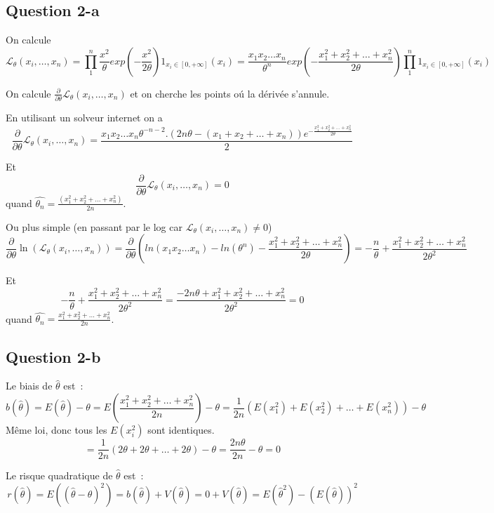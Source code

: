 \documentclass[]{book}
\theoremstyle{definition}
\begin{document}
\subsection*{Question 2-a}
On calcule
$$
\mathcal{L}_{\theta}(x_i,\ldots,x_n) = 
\prod_{1}^{n}\frac{x^2}{\theta} exp \left( -\frac{x^2}{2\theta}\right) 1_{x_i \in [0,+\infty]}(x_i) =
\frac{x_1x_2 \ldots x_n}{\theta^n} exp \left( -\frac{x_1^2+x_2^2+ \ldots +x_n^2 }{2\theta} \right) \prod_{1}^{n}{1_{x_i \in [0,+\infty]}(x_i)}
$$

On calcule $\frac{\partial}{\partial \theta} \mathcal{L}_{\theta}(x_i,\ldots,x_n)$ et on cherche  les points o\'u la d\'eriv\'ee s'annule. 

En utilisant un solveur internet on a 
$$
\frac{\partial}{\partial \theta} \mathcal{L}_{\theta}(x_i,\ldots,x_n) = \frac{x_1 x_2 \ldots x_n \theta^{-n-2}.(2n\theta - (x_1+x_2+\ldots + x_n)) e^{-\frac{x_1^2+x_2^2+ \ldots + x_n^2}{2\theta}}} {2}
$$

Et
$$
\frac{\partial}{\partial \theta} \mathcal{L}_{\theta}(x_i,\ldots,x_n) = 0
$$
quand $\hat{\theta_n} = \frac{(x_1^2+x_2^2+\ldots + x_n^2)}{2n}$.

Ou plus simple (en passant par le log car $\mathcal{L}_{\theta}(x_i,\ldots,x_n) \neq 0$)
$$
\frac{\partial}{\partial \theta} \ln(\mathcal{L}_{\theta}(x_i,\ldots,x_n)) = \frac{\partial}{\partial \theta} \left( ln(x_1x_2 \ldots x_n) - ln(\theta^n)  -  \frac{x_1^2+x_2^2+ \ldots + x_n^2}{2\theta} \right) = -\frac{n}{\theta} + \frac{x_1^2+x_2^2+ \ldots + x_n^2}{2\theta^2}
$$

Et
$$
-\frac{n}{\theta}+\frac{x_1^2+x_2^2+ \ldots + x_n^2}{2\theta^2} = \frac{-2n\theta + x_1^2+x_2^2+ \ldots + x_n^2}{2\theta^2} = 0
$$
quand $\hat{\theta_n} = \frac{x_1^2+x_2^2+\ldots + x_n^2}{2n}$.

\subsection*{Question 2-b}
Le biais de $\hat{\theta}$ est~:
$$
b(\hat{\theta}) = E(\hat{\theta}) - \theta = E\left(\frac{x_1^2+x_2^2+\ldots + x_n^2}{2n}\right) - \theta = \frac{1}{2n}(E(x_1^2) + E(x_2^2) + \ldots + E(x_n^2)) - \theta
$$
M\^eme loi, donc tous les $E(x_i^2)$ sont identiques. 
$$
=\frac{1}{2n}(2\theta + 2\theta + \ldots + 2\theta) - \theta = \frac{2n\theta}{2n} - \theta = 0
$$

Le risque quadratique de $\hat{\theta}$ est~:
$$
r(\hat{\theta}) = E((\hat{\theta} - \theta)^2) = b(\hat{\theta}) + V(\hat{\theta}) = 0 + V(\hat{\theta}) = E(\hat{\theta}^2) - (E(\hat{\theta}))^2
$$
\end{document}
